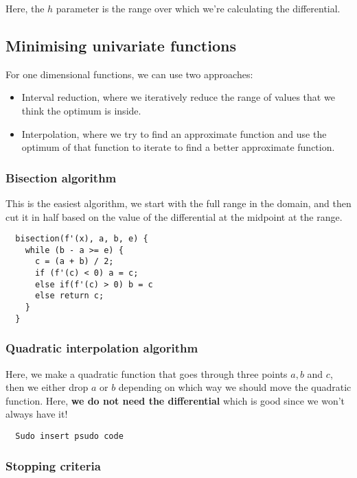 Here, the $h$ parameter is the range over which we're calculating the
differential.

\subsection{Minimising univariate functions}

For one dimensional functions, we can use two approaches:

\begin{itemize}
  \item Interval reduction, where we iteratively reduce the range of values that
  we think the optimum is inside.
  \item Interpolation, where we try to find an approximate function and use the
  optimum of that function to iterate to find a better approximate function.
\end{itemize}

\subsubsection{Bisection algorithm}

This is the easiest algorithm, we start with the full range in the domain, and
then cut it in half based on the value of the differential at the midpoint at
the range.

\begin{verbatim}
  bisection(f'(x), a, b, e) {
    while (b - a >= e) {
      c = (a + b) / 2;
      if (f'(c) < 0) a = c;
      else if(f'(c) > 0) b = c
      else return c;
    }
  }
\end{verbatim}

\subsubsection{Quadratic interpolation algorithm}

Here, we make a quadratic function that goes through three points $a, b$ and
$c$, then we either drop $a$ or $b$ depending on which way we should move the
quadratic function. Here, \textbf{we do not need the differential} which is good
since we won't always have it!


\begin{verbatim}
  Sudo insert psudo code
\end{verbatim}

\subsubsection{Stopping criteria}

